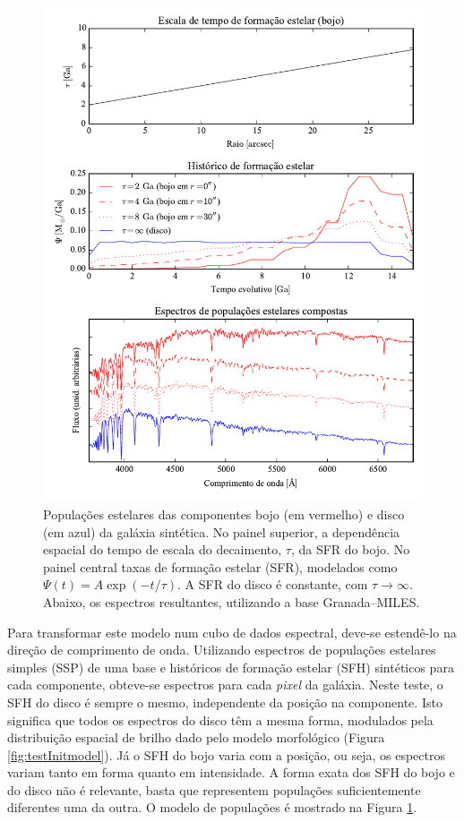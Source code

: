 \begin{figure}
	\includegraphics{figuras/simulation_popmodel}
	\caption[Modelos de populações estelares da galáxia sintética]
	{Populações estelares das componentes bojo (em vermelho)
	e disco (em azul) da galáxia sintética. No painel superior, a dependência
	espacial do tempo de escala do decaimento, $\tau$, da SFR do bojo. No painel
	central taxas de formação estelar (SFR), modelados como $\Psi(t) = A \exp
	(-t/\tau)$. A SFR do disco é constante, com $\tau\to\infty$. Abaixo, os
	espectros resultantes, utilizando a base Granada--MILES.}
	\label{fig:testPopmodel}
\end{figure}

Para transformar este modelo num cubo de dados espectral, deve-se estendê-lo na
direção de comprimento de onda. Utilizando espectros de populações estelares
simples (SSP) de uma base e históricos de formação estelar (SFH) sintéticos
para cada componente, obteve-se espectros para cada {\em pixel} da galáxia. Neste
teste, o SFH do disco é sempre o mesmo, independente da posição na componente.
Isto significa que todos os espectros do disco têm a mesma forma, modulados pela
distribuição espacial de brilho dado pelo modelo morfológico (Figura
\ref{fig:testInitmodel}). Já o SFH do bojo varia com a posição, ou seja, os
espectros variam tanto em forma quanto em intensidade. A forma exata dos SFH do
bojo e do disco não é relevante, basta que representem populações
suficientemente diferentes uma da outra. O modelo de populações é mostrado na
Figura \ref{fig:testPopmodel}.

